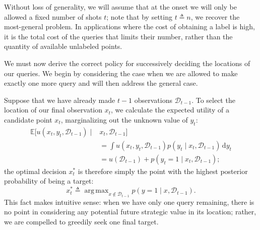\documentclass{acm_proc_article-sp}
\newcommand{\cm}[1]{\mathcal{#1}}
\newcommand{\data}{\cm{D}}
\newcommand{\given}{\mid}
\newcommand{\intd}[1]{\,\mathrm{d}#1}
\newcommand{\deq}{\triangleq}
\DeclareMathOperator*{\argmax}{arg\,max}
\begin{document}
Without loss of generality, we will assume that at the onset we will
only be allowed a fixed number of shots $t$; note that by setting $t
\deq n$, we recover the most-general problem.  In applications where
the cost of obtaining a label is high, it is the total cost of the
queries that limits their number, rather than the quantity of
available unlabeled points.  

We must now derive the correct policy for successively deciding the
locations of our queries.  We begin by considering the case when we
are allowed to make exactly one more query and will then address the
general case.

Suppose that we have already made $t-1$ observations $\data_{t-1}$.
To select the location of our final observation $x_t$, we calculate
the expected utility of a candidate point $x_t$, marginalizing out the
unknown value of $y_t$:
\begin{align*}
  \mathbb{E}
  \bigl[
    u(x_t, y_t, \data_{t-1}) \given{}&{}x_t, \data_{t-1} 
  \bigr]
  \\
  &=
  \int u(x_t, y_t, \data_{t-1}) p(y_t \given x_t, \data_{t-1}) \intd{y_t} 
  \\
  &=
  u(\data_{t-1}) + p(y_t = 1 \given x_t, \data_{t-1});
\end{align*}
the optimal decision $x_t^\ast$ is therefore simply the point with the
highest posterior probability of being a target:
\begin{equation}\label{onestep}
  x_t^\ast 
  \triangleq 
  \argmax_{x \notin \data_{t-1}} 
  p(y = 1\given x, \data_{t-1}).
\end{equation}
This fact makes intuitive sense: when we have only one query
remaining, there is no point in considering any potential future
strategic value in its location; rather, we are compelled to greedily
seek one final target.
\end{document}
